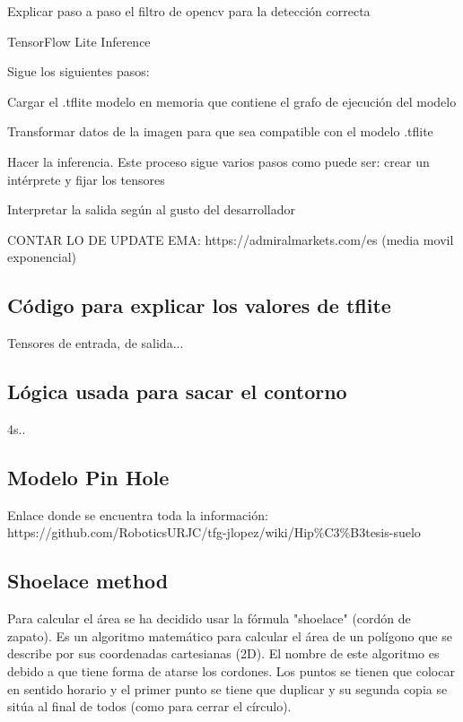 Explicar paso a paso el filtro de opencv para la detección correcta


TensorFlow Lite Inference

Sigue los siguientes pasos:

Cargar el .tflite modelo en memoria que contiene el grafo de ejecución del modelo

Transformar datos de la imagen para que sea compatible con el modelo .tflite

Hacer la inferencia. Este proceso sigue varios pasos como puede ser: crear un intérprete y fijar los tensores

Interpretar la salida según al gusto del desarrollador



CONTAR LO DE UPDATE EMA: https://admiralmarkets.com/es  (media movil exponencial)

\subsection{Código para explicar los valores de tflite}
\label{subsec:valorestflite}

Tensores de entrada, de salida...

\subsection{Lógica usada para sacar el contorno}
\label{subsec:contorno}

4s..


\subsection{Modelo Pin Hole}
\label{subsec:softwarepinhole}

Enlace donde se encuentra toda la información: https://github.com/RoboticsURJC/tfg-jlopez/wiki/Hip\%C3\%B3tesis-suelo

\subsection{Shoelace method}
\label{subsec:softwareshoelace}



Para calcular el área se ha decidido usar la fórmula "shoelace" (cordón de zapato). Es un algoritmo matemático para calcular el área de un polígono que se describe por sus coordenadas cartesianas (2D). El nombre de este algoritmo es debido a que tiene forma de atarse los cordones. Los puntos se tienen que colocar en sentido horario y el primer punto se tiene que duplicar y su segunda copia se sitúa al final de todos (como para cerrar el círculo).

